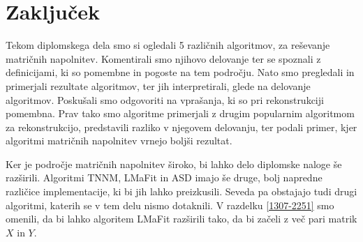 \chapter{Zaključek}\label{1407-1013}

Tekom diplomskega dela smo si ogledali 5 različnih algoritmov, za reševanje matričnih napolnitev. Komentirali smo njihovo delovanje ter se spoznali z definicijami, ki so pomembne in pogoste na tem področju. Nato smo pregledali in primerjali rezultate algoritmov, ter jih interpretirali, glede na delovanje algoritmov. Poskušali smo odgovoriti na vprašanja, ki so pri rekonstrukciji pomembna. Prav tako smo algoritme primerjali z drugim popularnim algoritmom za rekonstrukcijo, predstavili razliko v njegovem delovanju, ter podali primer, kjer algoritmi matričnih napolnitev vrnejo boljši rezultat.

Ker je področje matričnih napolnitev široko, bi lahko delo diplomske naloge še razširili. Algoritmi TNNM, LMaFit in ASD imajo še druge, bolj napredne različice implementacije, ki bi jih lahko preizkusili. Seveda pa obstajajo tudi drugi algoritmi, katerih se v tem delu nismo dotaknili. V razdelku \ref{1307-2251} smo omenili, da bi lahko algoritem LMaFit razširili tako, da bi začeli z več pari matrik $X$ in $Y$. 